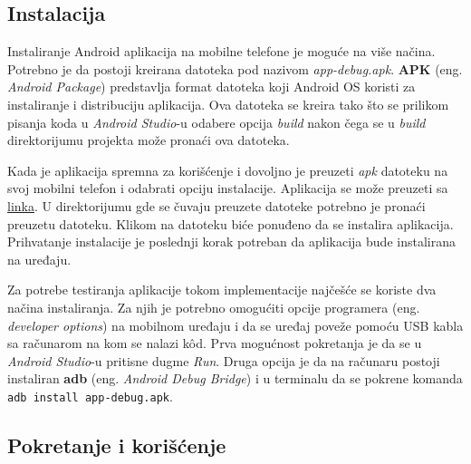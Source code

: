 \documentclass[implementacija.tex]{subfiles}
\begin{document}
\subsection{Instalacija}
Instaliranje Android aplikacija na mobilne telefone je moguće na više načina. Potrebno je da postoji kreirana datoteka pod nazivom \textit{app-debug.apk}. \textbf{APK} (eng. \textit{Android Package}) predstavlja format datoteka koji Android OS koristi za instaliranje i distribuciju aplikacija. Ova datoteka se kreira tako što se prilikom pisanja koda u \textit{Android Studio}-u odabere opcija \textit{build} nakon čega se u \textit{build} direktorijumu projekta može pronaći ova datoteka.

Kada je aplikacija spremna za korišćenje i dovoljno je preuzeti \textit{apk} datoteku na svoj mobilni telefon i odabrati opciju instalacije. Aplikacija se može preuzeti sa \hyperlink{https://drive.google.com/file/d/1gBlfRibn4jrFDe3TTBCsHUq9MDowEBty/view?usp=share_link}{linka}. U direktorijumu gde se čuvaju preuzete datoteke potrebno je pronaći preuzetu datoteku. Klikom na datoteku biće ponuđeno da se instalira aplikacija. Prihvatanje instalacije je poslednji korak potreban da aplikacija bude instalirana na uređaju.

Za potrebe testiranja aplikacije tokom implementacije najčešće se koriste dva načina instaliranja. Za njih je potrebno omogućiti opcije programera (eng. \textit{developer options}) na mobilnom uređaju i da se uređaj poveže pomoću USB kabla sa računarom na kom se nalazi k\^{o}d. Prva mogućnost pokretanja je da se u \textit{Android Studio}-u pritisne dugme \textit{Run}. Druga opcija je da na računaru postoji instaliran \textbf{adb} (eng. \textit{Android Debug Bridge}) i u terminalu da se pokrene komanda \verb|adb install app-debug.apk|. 

\subsection{Pokretanje i korišćenje}
\end{document}
